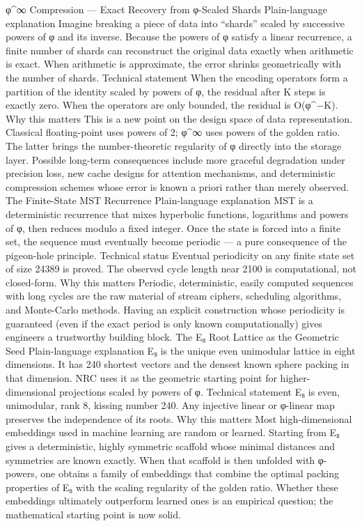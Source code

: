 φ^∞ Compression — Exact Recovery from φ-Scaled Shards
Plain-language explanation
Imagine breaking a piece of data into “shards” scaled by successive powers of φ and its inverse. Because the powers of φ satisfy a linear recurrence, a finite number of shards can reconstruct the original data exactly when arithmetic is exact. When arithmetic is approximate, the error shrinks geometrically with the number of shards.
Technical statement
When the encoding operators form a partition of the identity scaled by powers of φ, the residual after K steps is exactly zero. When the operators are only bounded, the residual is O(φ^{−K}).
Why this matters
This is a new point on the design space of data representation. Classical floating-point uses powers of 2; φ^∞ uses powers of the golden ratio. The latter brings the number-theoretic regularity of φ directly into the storage layer. Possible long-term consequences include more graceful degradation under precision loss, new cache designs for attention mechanisms, and deterministic compression schemes whose error is known a priori rather than merely observed.
The Finite-State MST Recurrence
Plain-language explanation
MST is a deterministic recurrence that mixes hyperbolic functions, logarithms and powers of φ, then reduces modulo a fixed integer. Once the state is forced into a finite set, the sequence must eventually become periodic — a pure consequence of the pigeon-hole principle.
Technical status
Eventual periodicity on any finite state set of size 24389 is proved. The observed cycle length near 2100 is computational, not closed-form.
Why this matters
Periodic, deterministic, easily computed sequences with long cycles are the raw material of stream ciphers, scheduling algorithms, and Monte-Carlo methods. Having an explicit construction whose periodicity is guaranteed (even if the exact period is only known computationally) gives engineers a trustworthy building block.
The E₈ Root Lattice as the Geometric Seed
Plain-language explanation
E₈ is the unique even unimodular lattice in eight dimensions. It has 240 shortest vectors and the densest known sphere packing in that dimension. NRC uses it as the geometric starting point for higher-dimensional projections scaled by powers of φ.
Technical statement
E₈ is even, unimodular, rank 8, kissing number 240. Any injective linear or φ-linear map preserves the independence of its roots.
Why this matters
Most high-dimensional embeddings used in machine learning are random or learned. Starting from E₈ gives a deterministic, highly symmetric scaffold whose minimal distances and symmetries are known exactly. When that scaffold is then unfolded with φ-powers, one obtains a family of embeddings that combine the optimal packing properties of E₈ with the scaling regularity of the golden ratio. Whether these embeddings ultimately outperform learned ones is an empirical question; the mathematical starting point is now solid.
